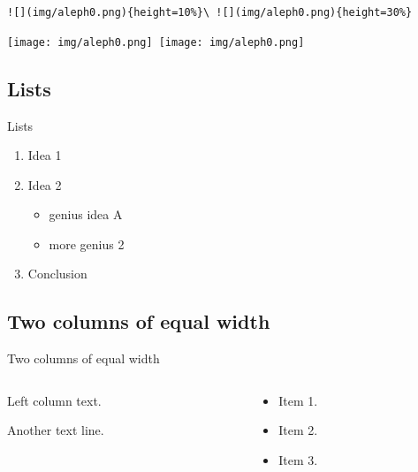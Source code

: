 \documentclass[
  ignorenonframetext,
  aspectratio=169,
  aspectratio=169]{beamer}
\providecommand{\tightlist}{%
  \setlength{\itemsep}{0pt}\setlength{\parskip}{0pt}}
\providecommand{\tightlist}{%
  \setlength{\itemsep}{0pt}\setlength{\parskip}{0pt}}
\begin{document}
\begin{frame}[fragile]{}
\label{section-1}
\begin{lstlisting}
![](img/aleph0.png){height=10%}\ ![](img/aleph0.png){height=30%} 
\end{lstlisting}

\texttt{[image: img/aleph0.png]}~\texttt{[image: img/aleph0.png]}
\end{frame}

\subsection{Lists}\label{lists}

\begin{frame}{Lists}
\begin{enumerate}
\tightlist
\item
  Idea 1
\item
  Idea 2

  \begin{itemize}
  \tightlist
  \item
    genius idea A
  \item
    more genius 2
  \end{itemize}
\item
  Conclusion
\end{enumerate}
\end{frame}

\subsection{Two columns of equal
width}\label{two-columns-of-equal-width}

\begin{frame}{Two columns of equal width}
\begin{columns}[T]
\begin{column}{0.48\textwidth}
Left column text.

Another text line.
\end{column}

\begin{column}{0.48\textwidth}
\begin{itemize}
\tightlist
\item
  Item 1.
\item
  Item 2.
\item
  Item 3.
\end{itemize}
\end{column}
\end{columns}
\end{frame}
\end{document}

